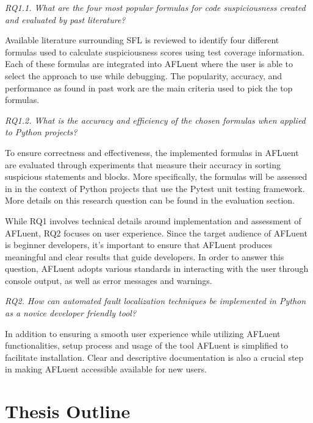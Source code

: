 \begin{center}
	\emph{RQ1.1. What are the four most popular formulas for code suspiciousness
	created and evaluated by past literature?
	}
\end{center}

Available literature surrounding SFL is reviewed to identify four
different formulas used to calculate suspiciousness scores using test coverage
information. Each of these formulas are integrated into AFLuent where the user
is able to select the approach to use while debugging. The popularity, accuracy,
and performance as found in past work are the main criteria used to pick the top
formulas.


\begin{center}
	\emph{RQ1.2.  What is the accuracy and efficiency of the chosen
	formulas when applied to Python projects?
	}
\end{center}

To ensure correctness and effectiveness, the implemented formulas in AFLuent are
evaluated through experiments that measure their accuracy in sorting suspicious
statements and blocks. More specifically, the formulas will be assessed in in
the context of Python projects that use the Pytest unit testing framework.
More details on this research question can be found in the evaluation section.

While RQ1 involves technical details around implementation and assessment of
AFLuent, RQ2 focuses on user experience. Since the target audience of AFLuent is
beginner developers, it's important to ensure that AFLuent produces meaningful
and clear results that guide developers. In order to answer this question,
AFLuent adopts various standards in interacting with the user through console
output, as well as error messages and warnings.

\begin{center}
	\emph{RQ2. How can automated fault localization techniques be implemented in
	Python as a novice developer friendly tool?
	}
\end{center}

In addition to ensuring a smooth user experience while utilizing AFLuent
functionalities, setup process and usage of the tool AFLuent is simplified to
facilitate installation. Clear and descriptive documentation is also a crucial
step in making AFLuent accessible available for new users.

\section{Thesis Outline}
\label{sec:outline}


